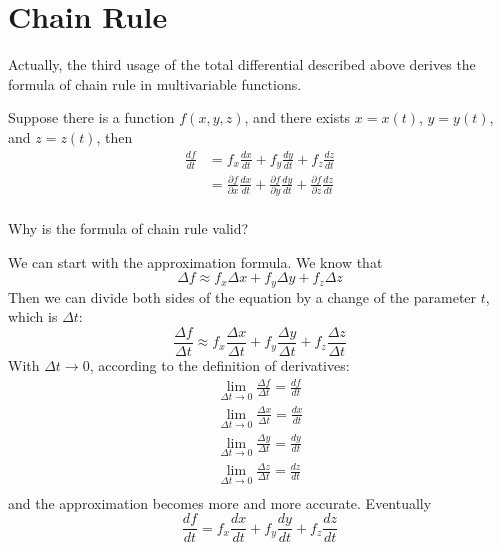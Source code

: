 \documentclass{article}
\begin{document}
\section{Chain Rule}

Actually, the third usage of the total differential described above derives the 
formula of chain rule in multivariable functions.

Suppose there is a function $f(x, y, z)$, and there exists $x = x(t)$, 
$y = y(t)$, and $z = z(t)$, then
\begin{equation*}
  \begin{split}
    \frac{df}{dt} &= f_x \frac{dx}{dt} + f_y \frac{dy}{dt} + f_z \frac{dz}{dt} \\
                  &= \frac{\partial f}{\partial x}\frac{dx}{dt} + \frac{\partial f}{\partial y}\frac{dy}{dt} + \frac{\partial f}{\partial z}\frac{dz}{dt} \\
  \end{split}
\end{equation*}

Why is the formula of chain rule valid?

We can start with the approximation formula. We know that
\begin{equation*}
  \Delta f \approx f_x \Delta x + f_y \Delta y + f_z \Delta z
\end{equation*}
Then we can divide both sides of the equation by a change of the parameter $t$, 
which is $\Delta t$:
\begin{equation*}
  \frac{\Delta f}{\Delta t} \approx f_x \frac{\Delta x}{\Delta t} + f_y \frac{\Delta y}{\Delta t} + f_z \frac{\Delta z}{\Delta t}
\end{equation*}
With $\Delta t \to 0$, according to the definition of derivatives:
\begin{gather*}
  \lim_{\Delta t \to 0}\frac{\Delta f}{\Delta t} = \frac{df}{dt} \\
  \lim_{\Delta t \to 0}\frac{\Delta x}{\Delta t} = \frac{dx}{dt} \\
  \lim_{\Delta t \to 0}\frac{\Delta y}{\Delta t} = \frac{dy}{dt} \\
  \lim_{\Delta t \to 0}\frac{\Delta z}{\Delta t} = \frac{dz}{dt} \\
\end{gather*}
and the approximation becomes more and more accurate. Eventually
\begin{equation*}
  \frac{df}{dt} = f_x \frac{dx}{dt} + f_y \frac{dy}{dt} + f_z \frac{dz}{dt}
\end{equation*}
\end{document}

